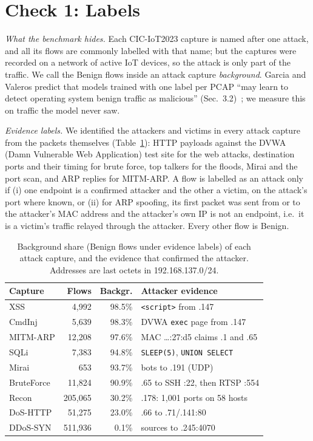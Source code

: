 \section{Check 1: Labels}\label{sec:labels}

\emph{What the benchmark hides.} Each CIC-IoT2023 capture is named after one attack, and all its flows are commonly labelled with that name; but the captures were recorded on a network of active IoT devices, so the attack is only part of the traffic. We call the Benign flows inside an attack capture \emph{background}. Garcia and Valeros predict that models trained with one label per PCAP ``may learn to detect operating system benign traffic as malicious'' (Sec.~3.2)~\cite{garcia2023labeling}; we measure this on traffic the model never saw.

\emph{Evidence labels.} We identified the attackers and victims in every attack capture from the packets themselves (Table~\ref{tab:background}): HTTP payloads against the DVWA (Damn Vulnerable Web Application) test site for the web attacks, destination ports and their timing for brute force, top talkers for the floods, Mirai and the port scan, and ARP replies for MITM-ARP. A flow is labelled as an attack only if (i) one endpoint is a confirmed attacker and the other a victim, on the attack's port where known, or (ii) for ARP spoofing, its first packet was sent from or to the attacker's MAC address and the attacker's own IP is not an endpoint, i.e.\ it is a victim's traffic relayed through the attacker. Every other flow is Benign.

\begin{table}[t]
\centering
\caption{Background share (Benign flows under evidence labels) of each attack capture, and the evidence that confirmed the attacker. Addresses are last octets in 192.168.137.0/24.}
\label{tab:background}
\footnotesize
\setlength{\tabcolsep}{3pt}
\begin{tabular}{lrr>{\raggedright\arraybackslash}p{3.85cm}}
\hline
Capture & Flows & Backgr. & Attacker evidence \\
\hline
XSS          &   4,992 & 98.5\% & \texttt{<script>} from .147 \\
CmdInj       &   5,639 & 98.3\% & DVWA \texttt{exec} page from .147 \\
MITM-ARP     &  12,208 & 97.6\% & MAC \ldots:27:d5 claims .1 and .65 \\
SQLi         &   7,383 & 94.8\% & \texttt{SLEEP(5)}, \texttt{UNION SELECT} \\
Mirai        &     653 & 93.7\% & 7 bots to .191 (UDP) \\
BruteForce   &  11,824 & 90.9\% & .65 to SSH :22, then RTSP :554 \\
Recon        & 205,065 & 30.2\% & .178: 1,001 ports on 58 hosts \\
DoS-HTTP     &  51,275 & 23.0\% & .66 to .71/.141:80 \\
DDoS-SYN     & 511,936 &  0.1\% & 6 sources to .245:4070 \\
\hline
\end{tabular}
\end{table}

